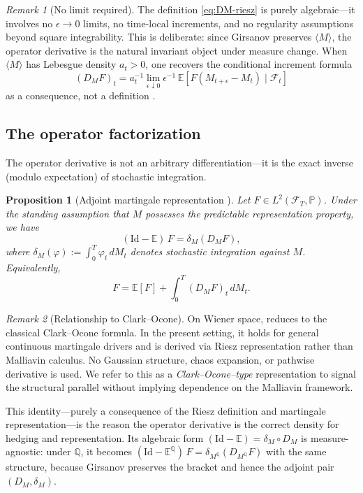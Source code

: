 \documentclass[11pt]{article}
\theoremstyle{plain}
\newtheorem{proposition}{Proposition}[section]
\theoremstyle{definition}
\theoremstyle{remark}
\newtheorem{remark}{Remark}[section]
\newcommand{\E}{\mathbb{E}}
\newcommand{\F}{\mathcal{F}}
\newcommand{\PP}{\mathbb{P}}
\newcommand{\QQ}{\mathbb{Q}}
\newcommand{\bracket}[1]{\langle #1 \rangle}
\begin{document}
\begin{remark}[No limit required]\label{rem:no-epsilon}
The definition \eqref{eq:DM-riesz} is purely algebraic---it involves no
$\epsilon \to 0$ limits, no time-local increments, and no regularity
assumptions beyond square integrability. This is deliberate: since Girsanov
preserves $\bracket{M}$, the operator derivative is the natural invariant
object under measure change. When $\bracket{M}$ has Lebesgue density $a_t > 0$,
one recovers the conditional increment formula
\[
(D_M F)_t = a_t^{-1}\lim_{\epsilon \downarrow 0} \epsilon^{-1}\,
\E[F(M_{t+\epsilon} - M_t) \mid \F_t]
\]
as a consequence, not a definition \cite{Fontes2026g}.
\end{remark}

\subsection{The operator factorization}

The operator derivative is not an arbitrary differentiation---it is the
exact inverse (modulo expectation) of stochastic integration.

\begin{proposition}[Adjoint martingale representation {\cite{Fontes2026a}}]\label{prop:clark-ocone-P}
Let $F \in L^2(\F_T, \PP)$. Under the standing assumption that $M$
possesses the predictable representation property, we have
\begin{equation}\label{eq:factorization}
(\mathrm{Id} - \E)\,F = \delta_M(D_M F),
\end{equation}
where $\delta_M(\varphi) := \int_0^T \varphi_t\,dM_t$ denotes stochastic
integration against $M$. Equivalently,
\[
F = \E[F] + \int_0^T (D_M F)_t\,dM_t.
\]
\end{proposition}

\begin{remark}[Relationship to Clark--Ocone]\label{rem:clark-ocone-distinction}
On Wiener space,  reduces to the classical
Clark--Ocone formula. In the present setting, it holds for general continuous
martingale drivers and is derived via Riesz representation rather than
Malliavin calculus. No Gaussian structure, chaos expansion, or pathwise
derivative is used. We refer to this as a \emph{Clark--Ocone--type}
representation to signal the structural parallel without implying
dependence on the Malliavin framework.
\end{remark}

This identity---purely a consequence of the Riesz definition and
martingale representation---is the reason the operator derivative is the
correct density for hedging and representation. Its algebraic form
$(\mathrm{Id} - \E) = \delta_M \circ D_M$ is measure-agnostic: under
$\QQ$, it becomes $(\mathrm{Id} - \E^{\QQ})\,F = \delta_{M^{\QQ}}(D_{M^{\QQ}} F)$
with the same structure, because Girsanov preserves the bracket and hence
the adjoint pair $(D_M, \delta_M)$.
\end{document}
